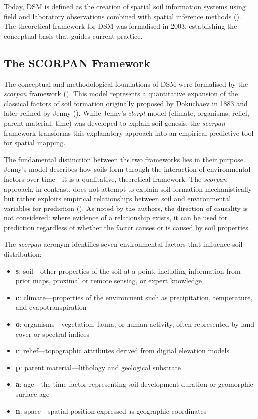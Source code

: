 \documentclass[
  10pt,
  b5paper,
  oneside]{book}
\providecommand{\tightlist}{%
  \setlength{\itemsep}{0pt}\setlength{\parskip}{0pt}}
\begin{document}
Today, DSM is defined as the creation of spatial soil information systems using field and laboratory observations combined with spatial inference methods (). The theoretical framework for DSM was formalised in 2003, establishing the conceptual basis that guides current practice.

\subsection{The SCORPAN Framework}\label{the-scorpan-framework}

The conceptual and methodological foundations of DSM were formalised by the \emph{scorpan} framework (). This model represents a quantitative expansion of the classical factors of soil formation originally proposed by Dokuchaev in 1883 and later refined by Jenny (). While Jenny's \emph{clorpt} model (climate, organisms, relief, parent material, time) was developed to explain soil genesis, the \emph{scorpan} framework transforms this explanatory approach into an empirical predictive tool for spatial mapping.

The fundamental distinction between the two frameworks lies in their purpose. Jenny's model describes how soils form through the interaction of environmental factors over time---it is a qualitative, theoretical framework. The \emph{scorpan} approach, in contrast, does not attempt to explain soil formation mechanistically but rather exploits empirical relationships between soil and environmental variables for prediction (). As noted by the authors, the direction of causality is not considered: where evidence of a relationship exists, it can be used for prediction regardless of whether the factor causes or is caused by soil properties.

The \emph{scorpan} acronym identifies seven environmental factors that influence soil distribution:

\begin{itemize}
\tightlist
\item
  \textbf{s}: soil---other properties of the soil at a point, including information from prior maps, proximal or remote sensing, or expert knowledge
\item
  \textbf{c}: climate---properties of the environment such as precipitation, temperature, and evapotranspiration
\item
  \textbf{o}: organisms---vegetation, fauna, or human activity, often represented by land cover or spectral indices
\item
  \textbf{r}: relief---topographic attributes derived from digital elevation models
\item
  \textbf{p}: parent material---lithology and geological substrate
\item
  \textbf{a}: age---the time factor representing soil development duration or geomorphic surface age
\item
  \textbf{n}: space---spatial position expressed as geographic coordinates
\end{itemize}
\end{document}

